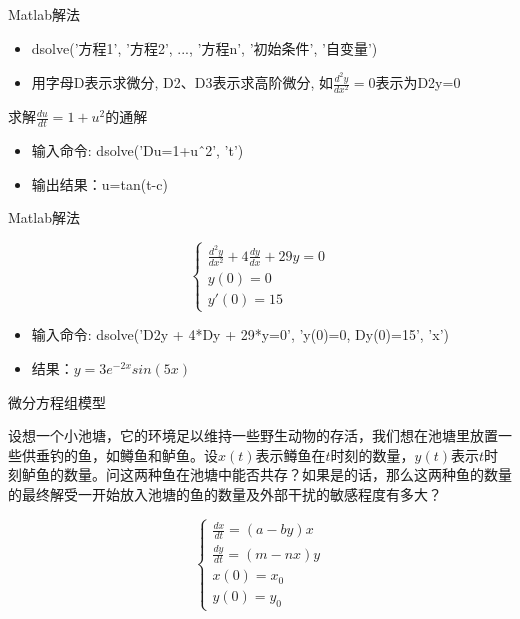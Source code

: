 \documentclass[mathserif, table]{beamer}
\begin{document}
\begin{frame}{Matlab解法}
  \begin{itemize}
  \item dsolve('方程1', '方程2', ..., '方程n', '初始条件', '自变量')
  \item 用字母D表示求微分, D2、D3表示求高阶微分, 如$\frac{d^2y}{dx^2}=0$表示为D2y=0
  \end{itemize}
  \begin{block}{}
    求解$\frac{du}{dt}=1+u^2$的通解
  \end{block}
  \begin{itemize}
  \item 输入命令: dsolve('Du=1+u\^\ 2', 't')
  \item 输出结果：u=tan(t-c)
  \end{itemize}
  
\end{frame}

\begin{frame}{Matlab解法}
  \begin{block}{}
  \[
  \left\{
  \begin{array}{l}
    \frac{d^2y}{dx^2} + 4\frac{dy}{dx} + 29y = 0\\
    y(0) = 0\\
    y'(0) = 15
  \end{array}
  \right.
  \]
  \end{block}

  \begin{itemize}
  \item 输入命令: dsolve('D2y + 4*Dy + 29*y=0', 'y(0)=0, Dy(0)=15', 'x')
  \item 结果：$y=3e^{-2x}sin(5x)$
  \end{itemize}
  
\end{frame}


\begin{frame}{微分方程组模型}
  \begin{block}{}
设想一个小池塘，它的环境足以维持一些野生动物的存活，我们想在池塘里放置一些供垂钓的鱼，如鳟鱼和鲈鱼。设$x(t)$表示鳟鱼在$t$时刻的数量，$y(t)$表示$t$时刻鲈鱼的数量。问这两种鱼在池塘中能否共存？如果是的话，那么这两种鱼的数量的最终解受一开始放入池塘的鱼的数量及外部干扰的敏感程度有多大？
  \end{block}

  \[
  \left\{
  \begin{array}{l}
    \frac{dx}{dt} = (a-by)x\\
    \frac{dy}{dt} = (m-nx)y\\
    x(0) = x_0\\
    y(0) = y_0
  \end{array}
  \right.
  \]
\end{frame}
\end{document}
